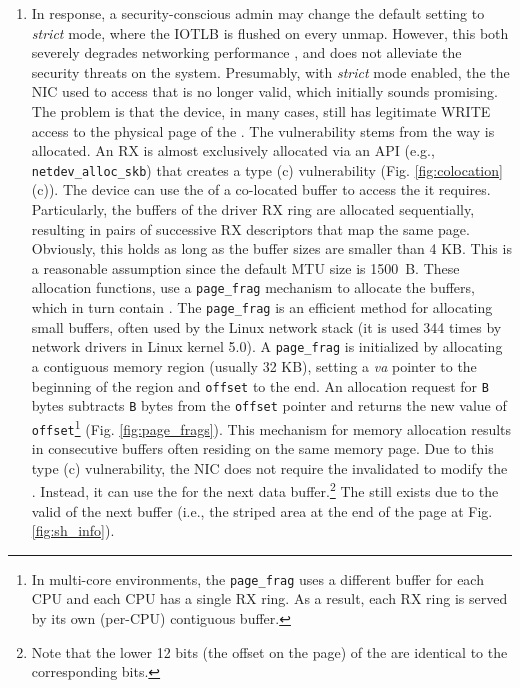 \begin{enumerate}[label=(\roman*),wide, labelwidth=!, labelindent=0pt]
\item In response, a security-conscious admin may change the default setting to \emph{strict} mode, where the IOTLB is flushed on every unmap. However, this both severely degrades networking performance \cite{MMT16,MSMT18}, and does not alleviate the security threats on the system. Presumably, with \emph{strict} mode enabled, the \iova{} the NIC used to access that \shinfo{} is no longer valid, which initially sounds promising. The problem is that the device, in many cases, still has legitimate WRITE access to the physical page of the \shinfo. The vulnerability stems from the way \data{} is allocated. An RX \skb{} is almost exclusively allocated via an API (e.g., \texttt{netdev\_alloc\_skb}) that creates a type (c) \subpage{} vulnerability (Fig. \ref{fig:colocation}(c)). The device can use the \iova{} of a co-located buffer to access the \shinfo{} it requires. Particularly, the buffers of the driver RX ring are allocated sequentially, resulting in pairs of successive RX descriptors that map the same page. Obviously, this holds as long as the buffer sizes are smaller than 4 KB. This is a reasonable assumption since the default MTU size is 1500~B. These allocation functions, use a \texttt{page\_frag} mechanism to allocate the \data{} buffers, which in turn contain \shinfo. The \texttt{page\_frag} is an efficient method for allocating small buffers, often used by the Linux network stack (it is used 344 times by network drivers in Linux kernel 5.0). A \texttt{page\_frag} is initialized by allocating a contiguous memory region (usually 32 KB), setting a \textit{va} pointer to the beginning of the region and \texttt{offset} to the end. An allocation request for \texttt{B} bytes subtracts \texttt{B} bytes from the \texttt{offset} pointer and returns the new value of \texttt{offset}\footnote{In multi-core environments, the \texttt{page\_frag} uses a different buffer for each CPU and each CPU has a single RX ring. As a result, each RX ring is served by its own (per-CPU) contiguous buffer.} (Fig. \ref{fig:page_frags}). This mechanism for memory allocation results in consecutive \data{} buffers often residing on the same memory page. Due to this type (c) \subpage{} vulnerability, the NIC does not require the invalidated \iova{} to modify the \shinfo. Instead, it can use the \iova{} for the next data buffer.\footnote{Note that the lower 12 bits (the offset on the page) of the \iova{} are identical to the corresponding \kva{} bits.} The \oportunity{} still exists due to the valid \iova of the next buffer (i.e., the striped area at the end of the page at Fig. \ref{fig:sh_info}).
\end{enumerate}

